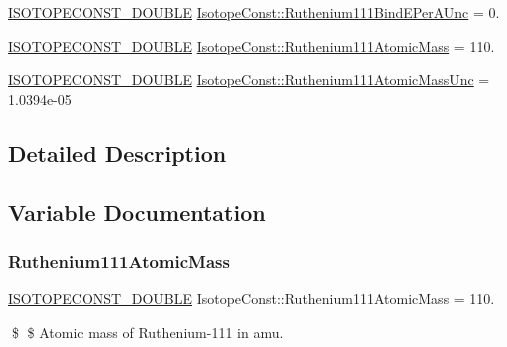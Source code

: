 \begin{DoxyCompactItemize}
\mbox{\hyperlink{group___isotope_const-_macros_ga8f45a7272ce02c0b4c65c44636ed719a}{I\+S\+O\+T\+O\+P\+E\+C\+O\+N\+S\+T\+\_\+\+D\+O\+U\+B\+LE}} \mbox{\hyperlink{group___isotope_const-_ruthenium-_ru111_ga7e580ff1b397600a0d8581cf21eb8750}{Isotope\+Const\+::\+Ruthenium111\+Bind\+E\+Per\+A\+Unc}} = 0.
\item 
\mbox{\hyperlink{group___isotope_const-_macros_ga8f45a7272ce02c0b4c65c44636ed719a}{I\+S\+O\+T\+O\+P\+E\+C\+O\+N\+S\+T\+\_\+\+D\+O\+U\+B\+LE}} \mbox{\hyperlink{group___isotope_const-_ruthenium-_ru111_ga800e3c5c4e5e8d23c7e9c8c52d01c7ab}{Isotope\+Const\+::\+Ruthenium111\+Atomic\+Mass}} = 110.
\item 
\mbox{\hyperlink{group___isotope_const-_macros_ga8f45a7272ce02c0b4c65c44636ed719a}{I\+S\+O\+T\+O\+P\+E\+C\+O\+N\+S\+T\+\_\+\+D\+O\+U\+B\+LE}} \mbox{\hyperlink{group___isotope_const-_ruthenium-_ru111_ga43eb5b9d1e1345c53a59d35483bb3982}{Isotope\+Const\+::\+Ruthenium111\+Atomic\+Mass\+Unc}} = 1.\+0394e-\/05
\end{DoxyCompactItemize}


\subsection{Detailed Description}


\subsection{Variable Documentation}
\mbox{\label{group___isotope_const-_ruthenium-_ru111_ga800e3c5c4e5e8d23c7e9c8c52d01c7ab}} 
\subsubsection{\texorpdfstring{Ruthenium111\+Atomic\+Mass}{Ruthenium111AtomicMass}}
{\footnotesize\ttfamily \mbox{\hyperlink{group___isotope_const-_macros_ga8f45a7272ce02c0b4c65c44636ed719a}{I\+S\+O\+T\+O\+P\+E\+C\+O\+N\+S\+T\+\_\+\+D\+O\+U\+B\+LE}} Isotope\+Const\+::\+Ruthenium111\+Atomic\+Mass = 110.}

\$ \$ Atomic mass of Ruthenium-\/111 in amu. \mbox{\label{group___isotope_const-_ruthenium-_ru111_ga43eb5b9d1e1345c53a59d35483bb3982}} 
